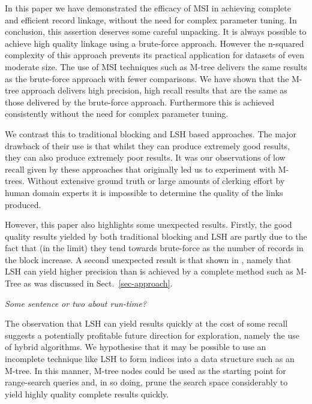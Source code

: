 \documentclass{llncs}
\begin{document}
In this paper we have demonstrated the efficacy of MSI in achieving  complete and efficient record linkage, without the need for complex parameter tuning. In conclusion, this assertion deserves some careful unpacking. It is always possible to achieve high quality linkage using a brute-force approach. However the n-squared complexity of this approach prevents its practical application for datasets of even moderate size. The use of MSI techniques such as M-tree delivers the same results as the brute-force approach with fewer comparisons. We have shown that the M-tree approach delivers high precision, high recall results that are the same as those delivered by the brute-force approach. Furthermore this is achieved consistently without the need for complex parameter tuning.

We contrast this to traditional blocking and LSH based approaches. The major drawback of their use is that whilst they can produce extremely good results, they can also produce extremely poor results. It was our observations of low recall given by these approaches that originally led us to experiment with M-trees. Without extensive ground truth or large amounts of clerking effort by human domain experts it is impossible to determine the quality of the links produced. 

However, this paper also highlights some unexpected results. Firstly, the good quality results yielded by both traditional blocking and LSH are partly due to the fact that (in the limit) they tend towards brute-force as the number of records in the block increase. A second unexpected result is that shown in , namely that LSH can yield higher precision than is achieved by a complete method such as M-Tree as was discussed in Sect.~\ref{sec-approach}.


\emph{Some sentence or two about run-time?}

The observation that LSH can yield results quickly at the cost of some recall suggests a potentially profitable future direction for exploration, namely the use of hybrid algorithms. We hypothesise that it may be possible to use an incomplete technique like LSH to form indices into a data structure such as an M-tree. In this manner, M-tree nodes could be used as the starting point for range-search queries and, in so doing, prune the search space considerably to yield highly quality complete results quickly.




 

\end{document}
